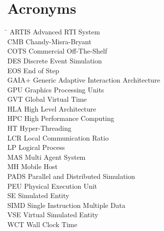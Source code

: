 \documentclass[1p]{elsarticle}
\begin{document}
\section*{Acronyms}

\begin{tabbing}
\hspace{15mm}\=\kill
ARTIS \> Advanced RTI System\\
CMB \> Chandy-Misra-Bryant\\
COTS \> Commercial Off-The-Shelf\\
DES \> Discrete Event Simulation\\
EOS \> End of Step\\
GAIA+ \> Generic Adaptive Interaction Architecture\\
GPU \> Graphics Processing Units\\
GVT \> Global Virtual Time\\
HLA \> High Level Architecture\\
HPC \> High Performance Computing\\
HT \> Hyper-Threading\\
LCR \> Local Communication Ratio\\
LP \> Logical Process\\
MAS \> Multi Agent System\\
MH \> Mobile Host\\
PADS \> Parallel and Distributed Simulation\\
PEU \> Physical Execution Unit\\
SE \> Simulated Entity\\
SIMD \> Single Instruction Multiple Data\\
VSE \> Virtual Simulated Entity\\
WCT \> Wall Clock Time
\end{tabbing}



\end{document}
